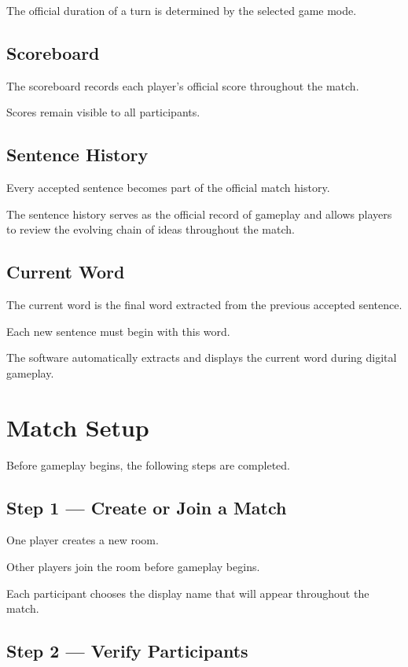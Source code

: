 \documentclass[11pt,a4paper]{article}
\begin{document}
The official duration of a turn is determined by the selected game mode.

\subsection{Scoreboard}

The scoreboard records each player's official score throughout the match.

Scores remain visible to all participants.

\subsection{Sentence History}

Every accepted sentence becomes part of the official match history.

The sentence history serves as the official record of gameplay and allows players to review the evolving chain of ideas throughout the match.

\subsection{Current Word}

The current word is the final word extracted from the previous accepted sentence.

Each new sentence must begin with this word.

The software automatically extracts and displays the current word during digital gameplay.

\section{Match Setup}

Before gameplay begins, the following steps are completed.

\subsection{Step 1 --- Create or Join a Match}

One player creates a new room.

Other players join the room before gameplay begins.

Each participant chooses the display name that will appear throughout the match.

\subsection{Step 2 --- Verify Participants}
\end{document}
